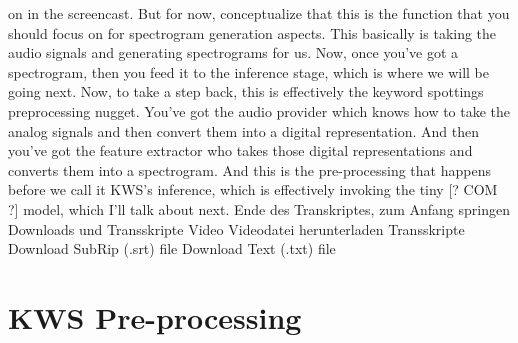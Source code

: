     on in the screencast.
    But for now, conceptualize that this is the function that you should focus on
    for spectrogram generation aspects.
    This basically is taking the audio signals
    and generating spectrograms for us.
    Now, once you've got a spectrogram, then you
    feed it to the inference stage, which is where we will be going next.
    Now, to take a step back, this is effectively the keyword spottings
    preprocessing nugget.
    You've got the audio provider which knows how to take the analog signals
    and then convert them into a digital representation.
    And then you've got the feature extractor
    who takes those digital representations and converts them into a spectrogram.
    And this is the pre-processing that happens
    before we call it KWS's inference, which is effectively
    invoking the tiny [? COM ?] model, which I'll talk about next.
    Ende des Transkriptes, zum Anfang springen
    Downloads und Transskripte
    Video
    Videodatei herunterladen
    Transskripte
    Download SubRip (.srt) file
    Download Text (.txt) file    
    
 \section{KWS Pre-processing}
 
